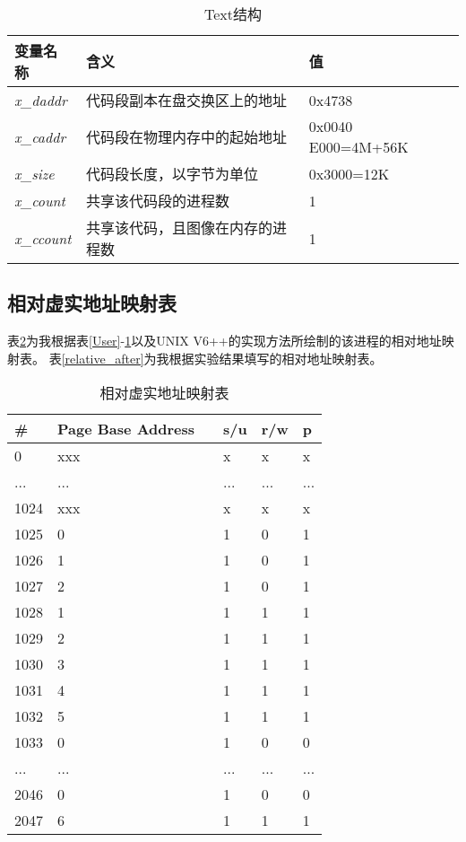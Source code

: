 \begin{table}[htbp]
    \centering
 \begin{tabular}{lll}\toprule
    变量名称      &含义         &值        \\\midrule
   \textit{x\_daddr    }&代码段副本在盘交换区上的地址     &  0x4738        \\
   \textit{x\_caddr    }&代码段在物理内存中的起始地址&  0x0040 E000=4M+56K   \\
   \textit{x\_size     }&代码段长度，以字节为单位  &  0x3000=12K   \\
   \textit{x\_count    }&共享该代码段的进程数    &  1            \\
   \textit{x\_ccount    }&共享该代码，且图像在内存的进程数 &  1            \\
   \bottomrule
\end{tabular}
\caption{Text结构}\label{Text}
\end{table}

\subsection{相对虚实地址映射表}
表\ref{relative}为我根据表\ref{User}-\ref{Text}以及UNIX V6++的实现方法所绘制的该进程的相对地址映射表。
表\ref{relative_after}为我根据实验结果填写的相对地址映射表。
\begin{table}[htbp]
      \centering

 \begin{tabular}{llllll}\toprule
 \#&Page Base Address      & &s/u&r/w&p        \\\midrule
 0&xxx      & &x&x&x        \\
 ...&...      & &...&...&...        \\
 1024&xxx      & &x&x&x        \\
 1025&0        & &1&0&1        \\
 1026&1        & &1&0&1        \\
 1027&2        & &1&0&1        \\
 1028&1        & &1&1&1        \\
 1029&2        & &1&1&1        \\
 1030&3        & &1&1&1        \\
 1031&4        & &1&1&1        \\
 1032&5        & &1&1&1        \\
 1033&0        & &1&0&0        \\
 ...&...      & &...&...&...        \\
 2046&0        & &1&0&0        \\
 2047&6        & &1&1&1        \\
   \bottomrule
\end{tabular}
\caption{相对虚实地址映射表}\label{relative}
\end{table}

